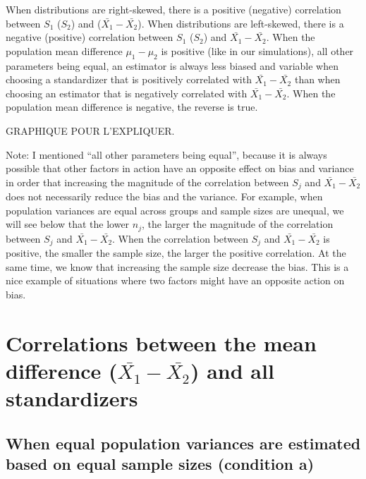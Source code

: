\documentclass[
  man]{apa6}
\begin{document}
When distributions are right-skewed, there is a positive (negative) correlation between \(S_1\) (\(S_2\)) and (\(\bar{X_1}-\bar{X_2}\)). When distributions are left-skewed, there is a negative (positive) correlation between \(S_1\) (\(S_2\)) and \(\bar{X_1}-\bar{X_2}\). When the population mean difference \(\mu_1-\mu_2\) is positive (like in our simulations), all other parameters being equal, an estimator is always less biased and variable when choosing a standardizer that is positively correlated with \(\bar{X_1}-\bar{X_2}\) than when choosing an estimator that is negatively correlated with \(\bar{X_1}-\bar{X_2}\). When the population mean difference is negative, the reverse is true.

GRAPHIQUE POUR L'EXPLIQUER.

Note: I mentioned \enquote{all other parameters being equal}, because it is always possible that other factors in action have an opposite effect on bias and variance in order that increasing the magnitude of the correlation between \(S_j\) and \(\bar{X_1}-\bar{X_2}\) does not necessarily reduce the bias and the variance. For example, when population variances are equal across groups and sample sizes are unequal, we will see below that the lower \(n_j\), the larger the magnitude of the correlation between \(S_j\) and \(\bar{X_1}-\bar{X_2}\). When the correlation between \(S_j\) and \(\bar{X_1}-\bar{X_2}\) is positive, the smaller the sample size, the larger the positive correlation. At the same time, we know that increasing the sample size decrease the bias. This is a nice example of situations where two factors might have an opposite action on bias.

\hypertarget{correlations-between-the-mean-difference-barx_1-barx_2-and-all-standardizers}{%
\section{\texorpdfstring{Correlations between the mean difference (\(\bar{X_1}-\bar{X_2}\)) and all standardizers}{Correlations between the mean difference (\textbackslash bar\{X\_1\}-\textbackslash bar\{X\_2\}) and all standardizers}}\label{correlations-between-the-mean-difference-barx_1-barx_2-and-all-standardizers}}

\hypertarget{when-equal-population-variances-are-estimated-based-on-equal-sample-sizes-condition-a}{%
\subsection{When equal population variances are estimated based on equal sample sizes (condition a)}\label{when-equal-population-variances-are-estimated-based-on-equal-sample-sizes-condition-a}}
\end{document}
